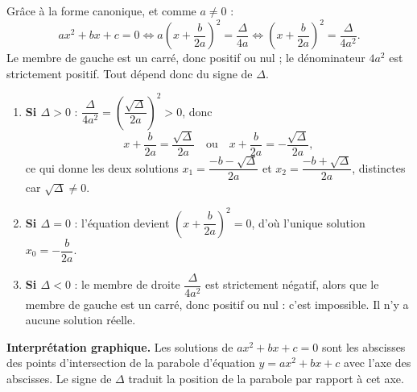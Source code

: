 \documentclass[11pt]{article}
\begin{document}
\begin{experience}
Grâce à la forme canonique, et comme $a\neq 0$ :
\[ ax^2+bx+c=0 \iff a\left(x+\frac{b}{2a}\right)^2=\frac{\Delta}{4a} \iff \left(x+\frac{b}{2a}\right)^2=\frac{\Delta}{4a^2}. \]
Le membre de gauche est un carré, donc positif ou nul ; le dénominateur $4a^2$ est strictement positif. Tout dépend donc du signe de $\Delta$.
\begin{enumerate}
\item \textbf{Si $\Delta>0$} : $\dfrac{\Delta}{4a^2}=\left(\dfrac{\sqrt{\Delta}}{2a}\right)^2>0$, donc
\[ x+\frac{b}{2a}=\frac{\sqrt{\Delta}}{2a} \quad \text{ou} \quad x+\frac{b}{2a}=-\frac{\sqrt{\Delta}}{2a}, \]
ce qui donne les deux solutions $x_1=\dfrac{-b-\sqrt{\Delta}}{2a}$ et $x_2=\dfrac{-b+\sqrt{\Delta}}{2a}$, distinctes car $\sqrt{\Delta}\neq 0$.
\item \textbf{Si $\Delta=0$} : l'équation devient $\left(x+\dfrac{b}{2a}\right)^2=0$, d'où l'unique solution $x_0=-\dfrac{b}{2a}$.
\item \textbf{Si $\Delta<0$} : le membre de droite $\dfrac{\Delta}{4a^2}$ est strictement négatif, alors que le membre de gauche est un carré, donc positif ou nul : c'est impossible. Il n'y a aucune solution réelle.
\end{enumerate}
\end{experience}

\textbf{Interprétation graphique.} Les solutions de $ax^2+bx+c=0$ sont les abscisses des points d'intersection de la parabole d'équation $y=ax^2+bx+c$ avec l'axe des abscisses. Le signe de $\Delta$ traduit la position de la parabole par rapport à cet axe.
\end{document}
